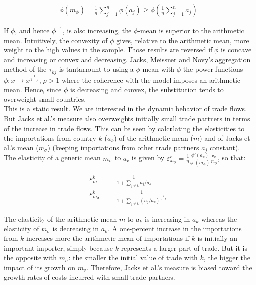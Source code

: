 \documentclass{article}
\begin{document}
\begin{eqnarray*}
\phi(m_{\phi})=\frac{1}{n}\sum_{j=1}^n\phi(a_j)\geq \phi\left(\frac{1}{n}\sum_{j=1}^n
a_j\right)
\end{eqnarray*}

If $\phi$, and hence $\phi^{-1}$, is also increasing, the
$\phi$-mean is superior to the arithmetic mean. Intuitively,
the convexity of $\phi$ gives, relative to the arithmetic mean,
more weight to the high values in the sample. Those results are
reversed if $\phi$ is concave and increasing or convex and
decreasing. Jacks, Meissner and Novy's aggregation method of
the $\tau_{kj}$ is tantamount to using a $\phi$-mean with
$\phi$ the power functions $\phi: x \rightarrow
x^{\frac{1}{1-\rho}}$, $\rho>1$ where the coherence with the
model imposes an arithmetic mean. Hence, since $\phi$ is
decreasing and convex, the substitution tends to overweight
small countries.\\

This is a static result. We are interested in the dynamic
behavior of trade flows. But Jacks et al.'s measure also
overweights initially small trade partners in terms of the
increase in trade flows. This can be seen by calculating the
elasticities to the importations from country $k$ ($a_k$) of
the arithmetic mean ($m$) and of Jacks et al.'s mean
($m_{\sigma}$) (keeping importations from other trade partners
$a_j$ constant). The elasticity of a generic mean $m_\sigma$ to
$a_k$ is given by
\mbox{$\varepsilon_{m_{\phi}}^k=\frac{1}{n}\frac{\phi'(a_k)}{\phi'(m_{\phi})}\frac{a_k}{m_{\phi}}$},
so that:

\begin{eqnarray*}
\varepsilon_m^k&=& \frac{1}{1+\sum\limits_{j \neq k} a_j/a_k}\\
\varepsilon_{m_{\sigma}}^k&=&\frac{1}{1+\sum\limits_{j\neq k} (a_j/a_k)^{\frac{1}{1-\sigma}}}
\end{eqnarray*}

The elasticity of the arithmetic mean $m$ to $a_k$ is
increasing in $a_k$ whereas the elasticity of $m_{\sigma}$ is
decreasing in $a_k$. A one-percent increase in the importations
from $k$ increases more the arithmetic mean of importations if
$k$ is initially an important importer, simply because $k$
represents a larger part of trade. But it is the opposite with
$m_{\sigma}$: the smaller the initial value of trade with $k$,
the bigger the impact of its growth on $m_{\sigma}$. Therefore,
Jacks et al.'s measure is biased toward the growth rates of
costs incurred with small trade partners.

\nocite{*}


\end{document}
